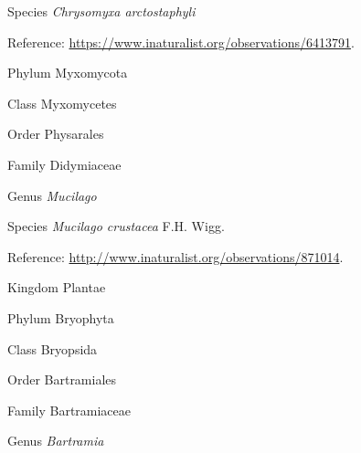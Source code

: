 \documentclass[9pt, article]{memoir}
\begin{document}
\begin{multicols}{2}
\vspace{6pt}\noindent\hspace{36pt}Species \textit{Chrysomyxa arctostaphyli}


\vspace{6pt}Reference: 
\url{https://www.inaturalist.org/observations/6413791}.

\vspace{6pt}\noindent\hspace{6pt}Phylum Myxomycota


\vspace{6pt}\noindent\hspace{12pt}Class Myxomycetes


\vspace{6pt}\noindent\hspace{18pt}Order Physarales


\vspace{6pt}\noindent\hspace{24pt}Family Didymiaceae


\vspace{6pt}\noindent\hspace{30pt}Genus \textit{Mucilago}


\vspace{6pt}\noindent\hspace{36pt}Species \textit{Mucilago crustacea} F.H. Wigg.


\vspace{6pt}Reference: 
\url{http://www.inaturalist.org/observations/871014}.

\vspace{6pt}\noindent\hspace{0pt}Kingdom Plantae


\vspace{6pt}\noindent\hspace{6pt}Phylum Bryophyta


\vspace{6pt}\noindent\hspace{12pt}Class Bryopsida


\vspace{6pt}\noindent\hspace{18pt}Order Bartramiales


\vspace{6pt}\noindent\hspace{24pt}Family Bartramiaceae


\vspace{6pt}\noindent\hspace{30pt}Genus \textit{Bartramia}



\end{multicols}
\end{document}
